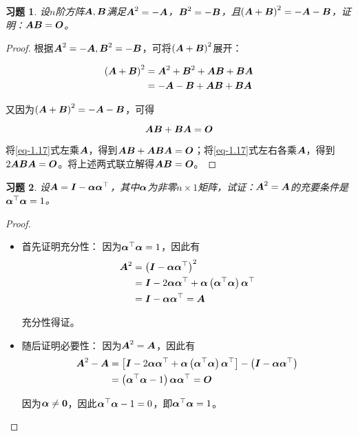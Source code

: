 \documentclass{ctexart}
\newtheorem{problem}{习题}[section]
\begin{document}
\begin{problem}
设\(n\)阶方阵\(\mata,\matb\)满足\(\mata^2=-\mata\)，\(\matb^2=-\matb\)，且\(\mypar{\mata+\matb}^2=-\mata-\matb\)，证明：\(\mata\matb=\mato\)。
\end{problem}
\begin{proof}
    根据\(\mata^2=-\mata,\matb^2=-\matb\)，可将\(\mypar{\mata+\matb}^2\)展开：

    \begin{align*}
        \mypar{\mata+\matb}^2 & =\mata^2+\matb^2+\mata\matb+\matb\mata \\
                              & =-\mata-\matb+\mata\matb+\matb\mata
    \end{align*}

    又因为\(\mypar{\mata+\matb}^2=-\mata-\matb\)，可得

    \begin{equation}\label{eq-1.17}
        \mata\matb+\matb\mata=\mato
    \end{equation}

    将\eqref{eq-1.17}式左乘\(\mata\)，得到\(\mata\matb+\mata\matb\mata=\mato\)；将\eqref{eq-1.17}式左右各乘\(\mata\)，得到\(2\mata\matb\mata=\mato\)。将上述两式联立解得\(\mata\matb=\mato\)。
\end{proof}

\setcounter{problem}{18}
\begin{problem}
设\(\mata=\mati-\vecal\vecal^\top\)，其中\(\vecal\)为非零\(n\times1\)矩阵，试证：\(\mata^2=\mata\)的充要条件是\(\vecal^\top\vecal=1\)。
\end{problem}
\begin{proof}
    \begin{itemize}
        \item 首先证明充分性：
              因为\(\vecal^\top\vecal=1\)，因此有
              \begin{align*}
                  \mata^2 & =\mypar{\mati-\vecal\vecal^\top}^2                                   \\
                          & =\mati-2\vecal\vecal^\top+\vecal\mypar{\vecal^\top\vecal}\vecal^\top \\
                          & =\mati-\vecal\vecal^\top=\mata
              \end{align*}

              充分性得证。

        \item 随后证明必要性：
              因为\(\mata^2=\mata\)，因此有
              \begin{align*}
                  \mata^2-\mata & =\mat{\mati-2\vecal\vecal^\top+\vecal\mypar{\vecal^\top\vecal}\vecal^\top}-\mypar{\mati-\vecal\vecal^\top} \\
                                & =\mypar{\vecal^\top\vecal-1}\vecal\vecal^\top=\mato
              \end{align*}

              因为\(\vecal\neq\veczero\)，因此\(\vecal^\top\vecal-1=0\)，即\(\vecal^\top\vecal=1\)。
    \end{itemize}
\end{proof}
\end{document}
